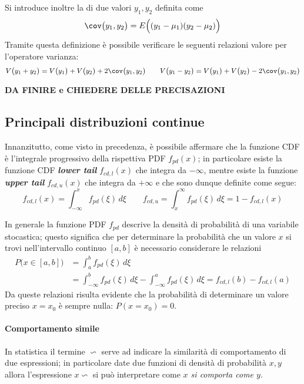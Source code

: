 		Si introduce inoltre la  di due valori $y_1,y_2$ definita come
		\begin{equation}
			\cov\big(y_1,y_2\big) = E \Big((y_1-\mu_1) (y_2-\mu_2)\Big)
		\end{equation}
		Tramite questa definizione è possibile verificare le seguenti relazioni valore per l'operatore varianza:
		\[V\big(y_1+y_2\big) = V\big(y_1\big) + V\big(y_2\big) + 2 \cov \big(y_1,y_2\big) \qquad V\big(y_1-y_2\big) = V\big(y_1\big) + V\big(y_2\big) - 2 \cov \big(y_1,y_2\big) \]
		
		\textbf{DA FINIRE e CHIEDERE DELLE PRECISAZIONI}
		
	\subsection{Principali distribuzioni continue}
		
		Innanzitutto, come visto in precedenza, è possibile affermare che la funzione CDF è l'integrale progressivo della rispettiva PDF $f_{pd}(x)$; in particolare esiste la funzione CDF \textbf{\textit{lower tail}} $f_{cd,l}(x)$ che integra da $-\infty$, mentre esiste la funzione \textbf{\textit{upper tail}} $f_{cd,u}(x)$ che integra da $+\infty$ e che sono dunque definite come segue:
		\begin{equation}
			f_{cd,l}(x) = \int_{-\infty} ^ x f_{pd}(\xi)\, d\xi \qquad f_{cd,u} = \int_x ^\infty f_{pd} (\xi) \, d\xi = 1-f_{cd,l}(x)
		\end{equation}
		
		In generale la funzione PDF $f_{pd}$ descrive la densità di probabilità di una variabile stocastica; questo significa che per determinare la probabilità che un valore $x$ si trovi nell'intervallo continuo $[a,b]$ è necessario considerare le relazioni
		\begin{align*}
			P\Big(x\in[a,b]\Big) & = \int _a ^b f_{pd}(\xi) \, d\xi \\ 
			&= \int_{-\infty}^b f_{pd}(\xi) \, d\xi - \int_{-\infty}^a f_{pd}(\xi)\, d\xi = f_{cd,l}(b) - f_{cd,l}(a)
		\end{align*}		
		Da queste relazioni risulta evidente che la probabilità di determinare un valore preciso $x=x_0$ è sempre nulla: $P(x=x_0) = 0$.
		
		\paragraph{Comportamento simile} In statistica il termine $\backsim$ serve ad indicare la similarità di comportamento di due espressioni; in particolare date due funzioni di densità di probabilità $x,y$ allora l'espressione $x\backsim$ si può interpretare come \textit{$x$ si comporta come $y$}.
		
